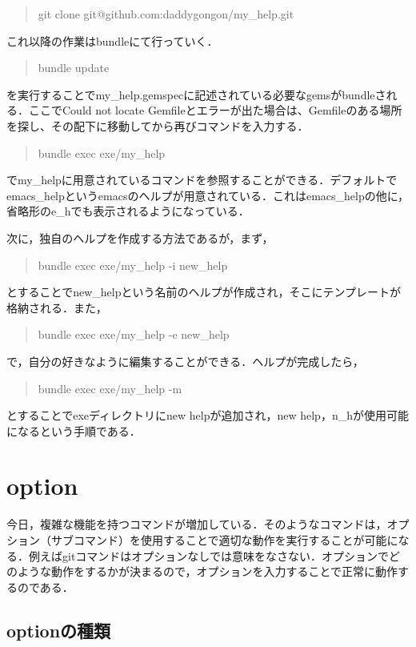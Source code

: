 \begin{quote}
git clone git@github.com:daddygongon/my\_help.git
\end{quote}
これ以降の作業はbundleにて行っていく．

\begin{quote}
bundle update
\end{quote}
を実行することでmy\_help.gemspecに記述されている必要なgemsがbundleされる．ここでCould
not locate
Gemfileとエラーが出た場合は、Gemfileのある場所を探し、その配下に移動してから再びコマンドを入力する．

\begin{quote}
bundle exec exe/my\_help
\end{quote}
でmy\_helpに用意されているコマンドを参照することができる．デフォルトでemacs\_helpというemacsのヘルプが用意されている．これはemacs\_helpの他に，省略形のe\_hでも表示されるようになっている．

次に，独自のヘルプを作成する方法であるが，まず，

\begin{quote}
bundle exec exe/my\_help -i new\_help
\end{quote}
とすることでnew\_helpという名前のヘルプが作成され，そこにテンプレートが格納される．また，

\begin{quote}
bundle exec exe/my\_help -e new\_help
\end{quote}
で，自分の好きなように編集することができる．ヘルプが完成したら，

\begin{quote}
bundle exec exe/my\_help -m
\end{quote}
とすることでexeディレクトリにnew helpが追加され，new
help，n\_hが使用可能になるという手順である．

    \section{option}\label{option}

今日，複雑な機能を持つコマンドが増加している．そのようなコマンドは，オプション（サブコマンド）を使用することで適切な動作を実行することが可能になる．例えばgitコマンドはオプションなしでは意味をなさない．オプションでどのような動作をするかが決まるので，オプションを入力することで正常に動作するのである．

\subsection{optionの種類}\label{}

